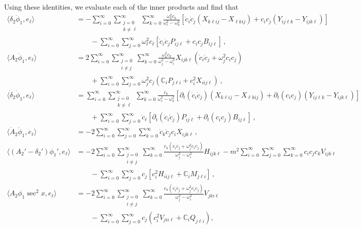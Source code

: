 \documentclass[letterpaper,11pt]{article}
\newcommand{\p}{\partial}
\newcommand{\oi}{\omega_i}
\newcommand{\oj}{\omega_j}
\newcommand{\ok}{\omega_k}
\newcommand{\ol}{\omega_\ell}
\begin{document}
Using these identities, we evaluate each of the inner products and find that
\begin{align}
\label{inner prod 1}
\langle \delta_2 \ddot \phi_1, e_\ell \rangle &= - \sum_{i = 0}^\infty \sum_{\substack{j=0 \\ k \neq \ell}}^\infty \sum_{k=0}^\infty \frac{\ok^2 c_k}{\ol^2 - \ok^2} \left[\dot c_i \dot c_j \left(X_{k\ell ij} - X_{\ell k i j} \right) + c_i c_j \left( Y_{ij\ell k} - Y_{ijk\ell} \right) \right] \nonumber \\
& \qquad  - \sum_{i=0}^\infty \sum_{j=0}^\infty \ol^2 c_\ell \left[ \dot c_i \dot c_j P_{ij\ell} + c_i c_j B_{i j \ell} \right] \, , \\
%
\langle A_2 \ddot \phi_1, e_\ell \rangle &= 2 \sum_{i = 0}^\infty \sum_{\substack{j=0 \\ i \neq j}}^\infty \sum_{k=0}^\infty \frac{\ok^2 c_k}{\oj^2 - \oi^2} X_{ijk \ell} \left( \dot c_i \dot c_j + \oj^2 c_i c_j \right) \nonumber \\
& \qquad + \sum_{i = 0}^\infty \sum_{j = 0}^\infty \oj^2 c_j \left( \mathbb C_i P_{j \ell i} + c_i^2 X_{ii j \ell} \right) \, , \\
%
\langle \dot \delta_2 \dot \phi_1 , e_\ell \rangle &= \sum_{i = 0}^\infty \sum_{\substack{j=0 \\ k \neq \ell}}^\infty \sum_{k=0}^\infty \frac{\dot c_k}{\ol^2 - \ok^2} \left[ \p_t \left( \dot c_i \dot c_j \right) \left( X_{k\ell ij} - X_{\ell k i j} \right) + \p_t (c_i c_j) \left(Y_{ij\ell k} - Y_{ijk\ell}\right) \right] \nonumber \\
& \qquad+ \sum_{i=0}^\infty \sum_{j=0}^\infty \dot c_\ell \left[ \p_t \left( \dot c_i \dot c_j \right) P_{ij\ell} + \p_t (c_i c_j) B_{ij\ell} \right] \, , \\
%
\langle \dot A_2 \dot \phi_1, e_\ell \rangle &= -2 \sum_{i=0}^\infty \sum_{j=0}^\infty \sum_{k=0}^\infty  \dot c_k \dot c_j c_i X_{ijk\ell} \, , \\
%
\langle \left( A_2' - \delta_2' \right) \phi_1', e_\ell \rangle &= - 2 \sum_{i = 0}^\infty \sum_{\substack{j=0 \\ i \neq j}}^\infty \sum_{k=0}^\infty \frac{c_k (\dot c_i \dot c_j + \oj^2 c_i c_j)}{\oj^2 -\oi^2} H_{ijk\ell} -m^2 \sum_{i=0}^\infty \sum _{j=0}^\infty \sum_{k=0}^\infty c_i c_j c_k V_{ijk\ell} \nonumber \\
%
& \qquad - \sum_{i=0}^\infty \sum_{j=0}^\infty c_j \left[ c_i^2 H_{iij\ell} + \mathbb C_i M_{j \ell i} \right] \, , \\
%
\label{inner prod 2}
\langle A_2 \phi_1 \sec^2 x, e_\ell \rangle &= - 2\sum_{i = 0}^\infty \sum_{\substack{j=0 \\ i \neq j}}^\infty \sum_{k=0}^\infty \frac{c_k (\dot c_i \dot c_j + \oj^2 c_i c_j )}{\oj^2 - \oi^2} V_{jki\ell} \nonumber \\
& \qquad - \sum_{i=0}^\infty \sum_{j=0}^\infty c_j \left( c_i^2 V_{jii\ell} + \mathbb C_i Q_{j\ell i} \right) ,
\end{align}
\end{document}
